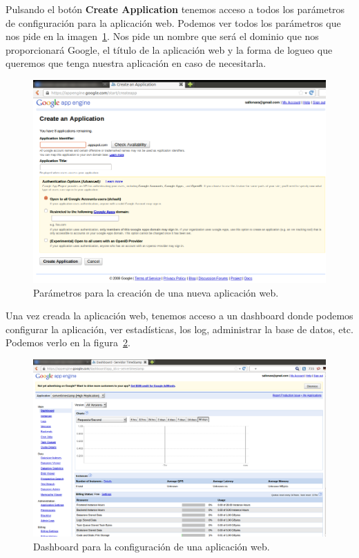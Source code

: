 Pulsando el botón \textbf{Create Application} tenemos acceso a todos los parámetros de configuración para la aplicación web. Podemos ver todos los parámetros que nos pide en la imagen~\ref{fig:createGAE}. Nos pide un nombre que será el dominio que nos proporcionará Google, el título de la aplicación web y la forma de logueo que queremos que tenga nuestra aplicación en caso de necesitarla.

\begin{figure}
  \centering
    \includegraphics[scale=0.6]{./ConfiguracionEclipse/imagenes/createGAE.png}
  \caption{Parámetros para la creación de una nueva aplicación web.}
  \label{fig:createGAE}
\end{figure}

Una vez creada la aplicación web, tenemos acceso a un dashboard donde podemos configurar la aplicación, ver estadísticas, los log, administrar la base de datos, etc. Podemos verlo en la figura~\ref{fig:dashboardGAE}.

\begin{figure}
  \centering
    \includegraphics[scale=0.6]{./ConfiguracionEclipse/imagenes/dashboardGAE.png}
  \caption{Dashboard para la configuración de una aplicación web.}
  \label{fig:dashboardGAE}
\end{figure}


